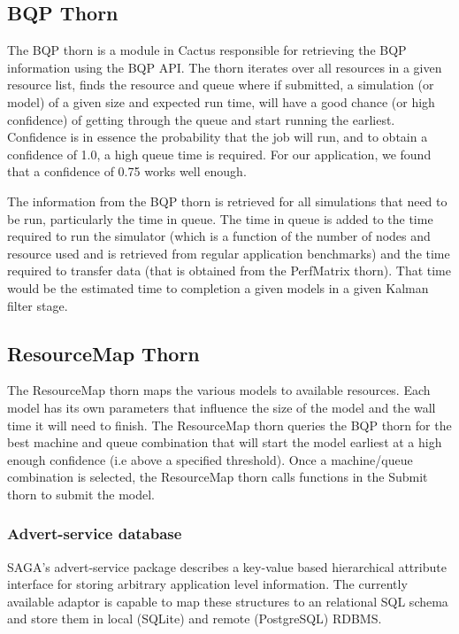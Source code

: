 \documentclass[conference,final]{IEEEtran}
\begin{document}

\subsection{BQP Thorn}
The BQP thorn is a module in Cactus responsible for retrieving the BQP
information using the BQP API. The thorn iterates over all resources
in a given resource list, finds the resource and queue where if
submitted, a simulation (or model) of a given size and
expected run time, will have a good chance (or high confidence) of
getting through the queue and start running the earliest. Confidence
is in essence the probability that the job will run, and to obtain a
confidence of 1.0, a high queue time is required. For our application,
we found that a confidence of 0.75 works well enough.

The information from the BQP thorn is retrieved for all simulations
that need to be run, particularly the time in queue. The time in queue
is added to the time required to run the simulator (which is a
function of the number of nodes and resource used and is retrieved
from regular application benchmarks) and the time required to transfer
data (that is obtained from the PerfMatrix thorn).  That time would be
the estimated time to completion a given models in a given Kalman filter stage.

\subsection{ResourceMap Thorn}
The ResourceMap thorn maps the various models to available resources.
Each model has its own parameters that influence the size of
the model and the wall time it will need to finish. The ResourceMap
thorn queries the BQP thorn for the best machine and queue combination
that will start the model earliest at a high enough confidence (i.e
above a specified threshold). Once a machine/queue combination is
selected, the ResourceMap thorn calls functions in the Submit thorn to
submit the model.

\subsubsection*{Advert-service database} SAGA's advert-service package
describes a key-value based hierarchical attribute interface for
storing arbitrary application level information. The currently
available adaptor is capable to map these structures to an relational
SQL schema and store them in local (SQLite) and remote (PostgreSQL)
RDBMS.
\end{document}
